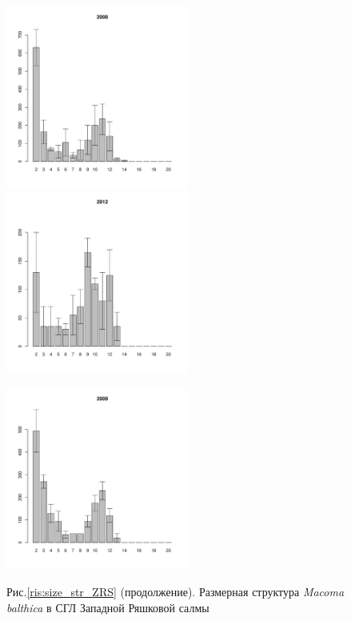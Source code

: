 \documentclass[12pt, a4paper]{article}
\begin{document}
\begin{figure}[h]
\begin{multicols}{3}
\end{multicols}


\begin{multicols}{3}
\hfill
\includegraphics[width=60mm]{../White_Sea/Ryashkov_ZRS/zrs2_2008_.pdf}
\hfill
\includegraphics[width=60mm]{../White_Sea/Ryashkov_ZRS/zrs2_2012_.pdf}
\hfill

\end{multicols}


\begin{multicols}{3}
\hfill
\includegraphics[width=60mm]{../White_Sea/Ryashkov_ZRS/zrs2_2009_.pdf}
\hfill

\end{multicols}


\begin{center}
Рис.\ref{ris:size_str_ZRS} (продолжение). Размерная структура {\it Macoma balthica} в СГЛ Западной Ряшковой салмы
\end{center}
\end{figure}
\end{document}
